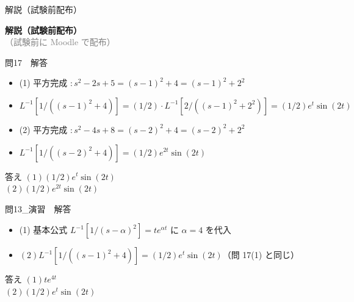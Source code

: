 \documentclass[aspectratio=43,professionalfonts,handout]{beamer}
\begin{document}
\begin{frame}{解説（試験前配布）}
  \vfill
  \begin{center}
  {\LARGE\bfseries\color{structure.fg} 解説（試験前配布）}\\[1em]
  {\normalsize\textcolor{gray}{（試験前に Moodle で配布）}}
  \end{center}
  \vfill
\end{frame}

\begin{frame}{問17　解答}
  \begin{block}{}
  \begin{itemize}\setlength{\itemsep}{2pt}
    \item (1) 平方完成 $: s^{2}-2s+5 = (s-1)^{2}+4 = (s-1)^{2}+2^{2}$
    \item $    L^{-1}[1/((s-1)^{2}+4)] = (1/2)\cdot L^{-1}[2/((s-1)^{2}+2^{2})] = (1/2)e^t \sin(2t)$
    \item (2) 平方完成 $: s^{2}-4s+8 = (s-2)^{2}+4 = (s-2)^{2}+2^{2}$
    \item $    L^{-1}[1/((s-2)^{2}+4)] = (1/2)e^{2t}\sin(2t)$
  \end{itemize}
  \end{block}
  \begin{exampleblock}{答え}
  $(1) (1/2)e^t \sin(2t)$\\
  $(2) (1/2)e^{2t}\sin(2t)$\\
  \end{exampleblock}
\end{frame}

\begin{frame}{問13\_演習　解答}
  \begin{block}{}
  \begin{itemize}\setlength{\itemsep}{2pt}
    \item (1) 基本公式 $L^{-1}[1/(s-\alpha)^{2}] = te^{\alpha t}$ に $\alpha=4$ を代入
    \item $(2) L^{-1}[1/((s-1)^{2}+4)] = (1/2)e^t \sin(2t)$（問 17(1) と同じ）
  \end{itemize}
  \end{block}
  \begin{exampleblock}{答え}
  $(1) te^{4t}$\\
  $(2) (1/2)e^t \sin(2t)$\\
  \end{exampleblock}
\end{frame}
\end{document}
